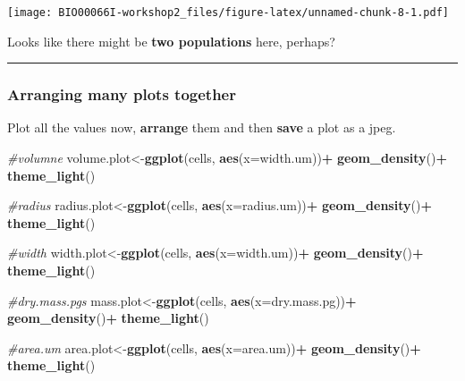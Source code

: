 \documentclass[
]{article}
\newenvironment{Shaded}{\begin{snugshade}}{\end{snugshade}}
\newcommand{\AttributeTok}[1]{\textcolor[rgb]{0.13,0.29,0.53}{#1}}
\newcommand{\CommentTok}[1]{\textcolor[rgb]{0.56,0.35,0.01}{\textit{#1}}}
\newcommand{\FunctionTok}[1]{\textcolor[rgb]{0.13,0.29,0.53}{\textbf{#1}}}
\newcommand{\NormalTok}[1]{#1}
\newcommand{\OtherTok}[1]{\textcolor[rgb]{0.56,0.35,0.01}{#1}}
\newcommand{\SpecialCharTok}[1]{\textcolor[rgb]{0.81,0.36,0.00}{\textbf{#1}}}
\begin{document}
\texttt{[image: BIO00066I-workshop2\_files/figure-latex/unnamed-chunk-8-1.pdf]}

Looks like there might be \textbf{two populations} here, perhaps?

\begin{center}\rule{0.5\linewidth}{0.5pt}\end{center}

\hypertarget{arranging-many-plots-together}{%
\subsubsection{Arranging many plots
together}\label{arranging-many-plots-together}}

Plot all the values now, \textbf{arrange} them and then \textbf{save} a
plot as a jpeg.

\begin{Shaded}
\begin{Highlighting}[]
\CommentTok{\#volumne}
\NormalTok{volume.plot}\OtherTok{\textless{}{-}}\FunctionTok{ggplot}\NormalTok{(cells, }\FunctionTok{aes}\NormalTok{(}\AttributeTok{x=}\NormalTok{width.um))}\SpecialCharTok{+}
  \FunctionTok{geom\_density}\NormalTok{()}\SpecialCharTok{+}
  \FunctionTok{theme\_light}\NormalTok{()}

\CommentTok{\#radius}
\NormalTok{radius.plot}\OtherTok{\textless{}{-}}\FunctionTok{ggplot}\NormalTok{(cells, }\FunctionTok{aes}\NormalTok{(}\AttributeTok{x=}\NormalTok{radius.um))}\SpecialCharTok{+}
  \FunctionTok{geom\_density}\NormalTok{()}\SpecialCharTok{+}
  \FunctionTok{theme\_light}\NormalTok{()}

\CommentTok{\#width}
\NormalTok{width.plot}\OtherTok{\textless{}{-}}\FunctionTok{ggplot}\NormalTok{(cells, }\FunctionTok{aes}\NormalTok{(}\AttributeTok{x=}\NormalTok{width.um))}\SpecialCharTok{+}
  \FunctionTok{geom\_density}\NormalTok{()}\SpecialCharTok{+}
  \FunctionTok{theme\_light}\NormalTok{()}

\CommentTok{\#dry.mass.pgs}
\NormalTok{mass.plot}\OtherTok{\textless{}{-}}\FunctionTok{ggplot}\NormalTok{(cells, }\FunctionTok{aes}\NormalTok{(}\AttributeTok{x=}\NormalTok{dry.mass.pg))}\SpecialCharTok{+}
  \FunctionTok{geom\_density}\NormalTok{()}\SpecialCharTok{+}
  \FunctionTok{theme\_light}\NormalTok{()}

\CommentTok{\#area.um}
\NormalTok{area.plot}\OtherTok{\textless{}{-}}\FunctionTok{ggplot}\NormalTok{(cells, }\FunctionTok{aes}\NormalTok{(}\AttributeTok{x=}\NormalTok{area.um))}\SpecialCharTok{+}
  \FunctionTok{geom\_density}\NormalTok{()}\SpecialCharTok{+}
  \FunctionTok{theme\_light}\NormalTok{()}


\end{Highlighting}
\end{Shaded}
\end{document}
